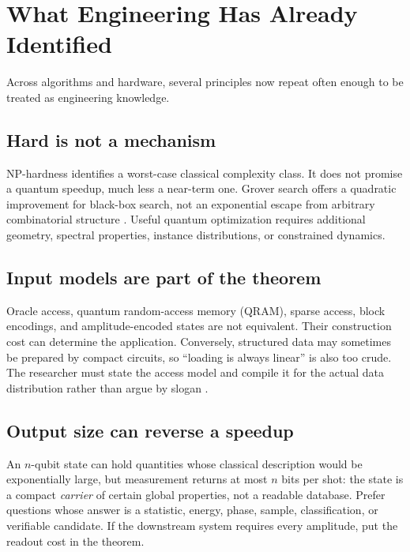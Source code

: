 \section{What Engineering Has Already Identified}

Across algorithms and hardware, several principles now repeat often enough to be treated as engineering knowledge.

\subsection{Hard is not a mechanism}

NP-hardness identifies a worst-case classical complexity class. It does not promise a quantum speedup, much less a near-term one. Grover search offers a quadratic improvement for black-box search, not an exponential escape from arbitrary combinatorial structure \citep{grover1997}. Useful quantum optimization requires additional geometry, spectral properties, instance distributions, or constrained dynamics.

\subsection{Input models are part of the theorem}

Oracle access, quantum random-access memory (QRAM), sparse access, block encodings, and amplitude-encoded states are not equivalent. Their construction cost can determine the application. Conversely, structured data may sometimes be prepared by compact circuits, so ``loading is always linear'' is also too crude. The researcher must state the access model and compile it for the actual data distribution rather than argue by slogan \citep{aaronson2015,tang2021}.

\subsection{Output size can reverse a speedup}

An $n$-qubit state can hold quantities whose classical description would be exponentially large, but measurement returns at most $n$ bits per shot: the state is a compact \emph{carrier} of certain global properties, not a readable database. Prefer questions whose answer is a statistic, energy, phase, sample, classification, or verifiable candidate. If the downstream system requires every amplitude, put the readout cost in the theorem.

